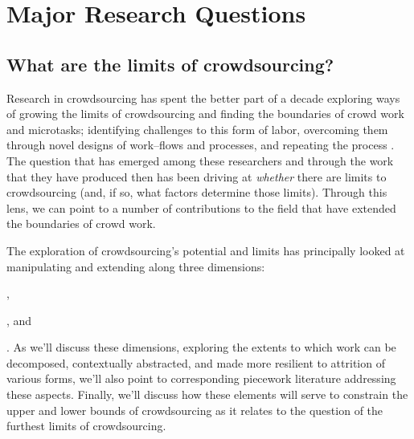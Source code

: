 \documentclass[trackingWork]{subfiles}
\begin{document}



\section{Major Research Questions}

                                     

\subsection{What are the limits of crowdsourcing?}
Research in crowdsourcing has spent the better part of a decade
exploring ways of growing the limits of crowdsourcing and
finding the boundaries of crowd work and microtasks;
  identifying challenges to this form of labor,
  overcoming them through novel designs of work--flows and processes,
and repeating the process
\cite{bernsteinSoylent}.
The question that has emerged
among these researchers and
through the work that they have produced then
has been driving at \textit{whether} there are limits to crowdsourcing
(and, if so, what factors determine those limits).
Through this lens, we can point to
a number of contributions to the field that have extended the boundaries of crowd work.

The exploration of crowdsourcing's potential and limits has principally looked at
manipulating and extending along three dimensions:
\begin{inlinelist}
  \item {},
  \item {}, and
  \item {}
\end{inlinelist}.
As we'll discuss these dimensions,
exploring the extents to which work can be
decomposed,
contextually abstracted, and
made more resilient to attrition of various forms,
we'll also point to corresponding piecework literature addressing these aspects.
Finally, we'll discuss how these elements will serve
to constrain the upper and lower bounds of crowdsourcing as it relates
to the question of the furthest limits of crowdsourcing.
\end{document}
